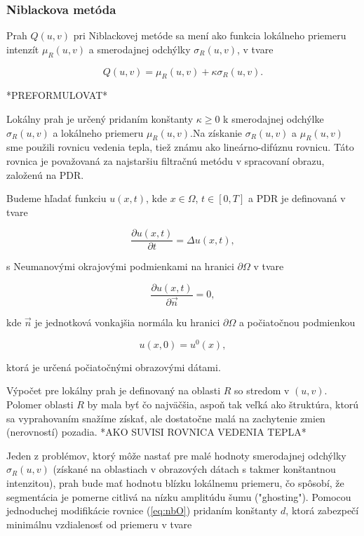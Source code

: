 \documentclass[a4paper,12pt,twoside]{article}%
\begin{document}
\subsubsection{Niblackova metóda} \label{niblack} 

Prah $Q(u, v)$ pri Niblackovej metóde sa mení ako funkcia lokálneho priemeru intenzít $\mu_R(u,v)$ a smerodajnej odchýlky $\sigma_R(u,v)$, v tvare

\begin{equation} \label{eq:nbO}
Q(u,v) = \mu_R(u,v) + \kappa\sigma_R(u,v).
\end{equation}

 *PREFORMULOVAT*

Lokálny prah je určený pridaním konštanty $\kappa \geq 0$ k smerodajnej odchýlke $\sigma_R(u,v)$ a lokálneho priemeru $\mu_R(u,v)$.Na získanie $\sigma_R(u,v)$ a $\mu_R(u,v)$ sme použili rovnicu vedenia tepla, tiež známu ako lineárno-difúznu rovnicu. Táto rovnica je považovaná za najstaršiu filtračnú metódu v spracovaní obrazu, založenú na PDR.

Budeme hľadať funkciu $u(x, t)$, kde $x \in \Omega$, $t \in [0, T]$ a PDR je definovaná v tvare

\begin{equation}
\frac{\partial u(x, t)}{\partial t} = \Delta u(x,t),
\end{equation}

s Neumanovými okrajovými podmienkami na hranici $\partial \Omega$ v tvare

\begin{equation}
\frac{\partial u(x, t)}{\partial \vec{n}} = 0,
\end{equation}

kde $\vec{n}$ je jednotková vonkajšia normála ku hranici $\partial \Omega$ a počiatočnou podmienkou 

\begin{equation}
u(x, 0) = u^0(x),
\end{equation}

ktorá je určená počiatočnými obrazovými dátami.

Výpočet pre lokálny prah je definovaný na oblasti $R$ so stredom v $(u, v)$. Polomer oblasti $R$ by mala byť čo najväčšia, aspoň tak veľká ako štruktúra, ktorú sa vyprahovaním snažíme získať, ale dostatočne malá na zachytenie zmien (nerovností) pozadia. *AKO SUVISI ROVNICA VEDENIA TEPLA*

Jeden z problémov, ktorý môže nastať pre malé hodnoty smerodajnej odchýlky $\sigma_R(u,v)$ (získané na oblastiach v obrazových dátach s takmer konštantnou intenzitou), prah bude mať hodnotu blízku lokálnemu priemeru, čo spôsobí, že segmentácia je pomerne citlivá na nízku amplitúdu šumu ("ghosting"). Pomocou jednoduchej modifikácie rovnice (\ref{eq:nbO}) pridaním konštanty $d$, ktorá zabezpečí minimálnu vzdialenosť od priemeru v tvare
\end{document}
